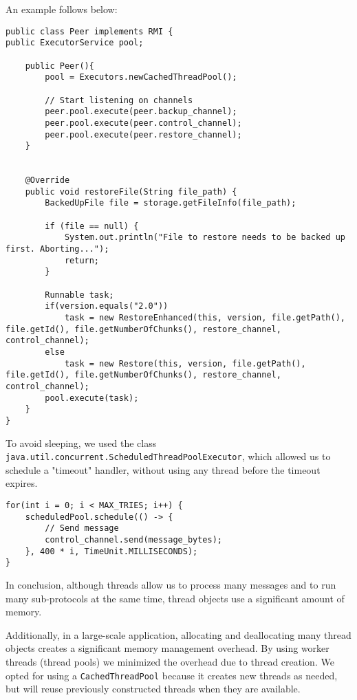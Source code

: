 \documentclass[11pt]{report}
\begin{document}
An example follows below:

\begin{verbatim}
public class Peer implements RMI {
public ExecutorService pool;

    public Peer(){
        pool = Executors.newCachedThreadPool();
        
        // Start listening on channels
        peer.pool.execute(peer.backup_channel);
        peer.pool.execute(peer.control_channel);
        peer.pool.execute(peer.restore_channel);
    }
    

    @Override
    public void restoreFile(String file_path) {
        BackedUpFile file = storage.getFileInfo(file_path);

        if (file == null) {
            System.out.println("File to restore needs to be backed up first. Aborting...");
            return;
        }

        Runnable task;
        if(version.equals("2.0"))
            task = new RestoreEnhanced(this, version, file.getPath(), file.getId(), file.getNumberOfChunks(), restore_channel, control_channel);
        else
            task = new Restore(this, version, file.getPath(), file.getId(), file.getNumberOfChunks(), restore_channel, control_channel);
        pool.execute(task);
    }
}
\end{verbatim}

To avoid sleeping, we used the class \texttt{java.util.concurrent.ScheduledThreadPoolExecutor}, which allowed us to schedule a "timeout" handler, without using any thread before the timeout expires.

\begin{verbatim}
for(int i = 0; i < MAX_TRIES; i++) {
    scheduledPool.schedule(() -> {
        // Send message
        control_channel.send(message_bytes);
    }, 400 * i, TimeUnit.MILLISECONDS);
}
\end{verbatim}

In conclusion, although threads allow us to process many messages and to run many sub-protocols at the same time, thread objects use a significant amount of memory. 

Additionally, in a large-scale application, allocating and deallocating many thread objects creates a significant memory management overhead. By using worker threads (thread pools) we minimized the overhead due to thread creation. We opted for using a \texttt{CachedThreadPool} because it creates new threads as needed, but will reuse previously constructed threads when they are available.
\end{document}
